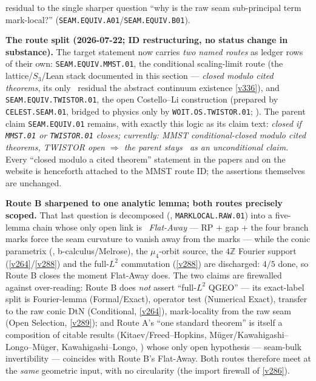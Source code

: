 \documentclass[11pt,a4paper]{article}
\newcommand{\Z}{\mathbb Z}
\begin{document}
\begin{keybox}
residual to the single sharper question ``why is the raw seam sub-principal term mark-local?''
(\texttt{SEAM.EQUIV.A01}/\texttt{SEAM.EQUIV.B01}).
\par\smallskip\noindent\textbf{The route split (2026-07-22; ID restructuring, no status change in
substance).} The target statement now carries \emph{two named routes} as ledger rows of their own:
\texttt{SEAM.EQUIV.MMST.01}, the conditional scaling-limit route (the lattice/$S_3$/Lean stack
documented in this section --- \emph{closed modulo cited theorems}, its only \mO\ residual the
abstract continuum existence \vref{v336}), and \texttt{SEAM.EQUIV.TWISTOR.01}, the open
Costello--Li construction (prepared by \texttt{CELEST.SEAM.01}, bridged to physics only by
\texttt{WOIT.OS.TWISTOR.01}; \mO). The parent claim \texttt{SEAM.EQUIV.01} remains, with exactly this
logic as its claim text: \emph{closed if \texttt{MMST.01} or \texttt{TWISTOR.01} closes; currently:
MMST conditional-closed modulo cited theorems, TWISTOR open $\Rightarrow$ the parent stays \mO\ as an
unconditional claim.} Every ``closed modulo a cited theorem'' statement in the papers and on the
website is henceforth attached to the MMST route ID; the assertions themselves are unchanged.
\par\smallskip\noindent\textbf{Route B sharpened to one analytic lemma; both routes precisely scoped.}
That last question is decomposed (, \texttt{MARKLOCAL.RAW.01}) into a five-lemma
chain whose only open link is \mO\ \emph{Flat-Away} --- RP $+$ gap $+$ the four branch marks force the seam
curvature to vanish away from the marks --- while the conic parametrix (\mC, b-calculus/Melrose), the
$\mu_4$-orbit source, the $4\Z$ Fourier support (\vref{v264}/\vref{v288}) and the full-$L^2$ commutation
(\vref{v288}) are discharged: $4/5$ done, so Route B closes the moment Flat-Away does. The two claims are
firewalled against over-reading: Route B does \emph{not} assert ``full-$L^2$ QGEO'' --- its exact-label split is
Fourier-lemma (Formal/Exact), operator test (Numerical Exact), transfer to the raw conic DtN (Conditional,
\vref{v264}), mark-locality from the raw seam (Open Selection, \vref{v289}); and Route A's ``one standard
theorem'' is itself a composition of citable results (Kitaev/Freed--Hopkins, M\"uger/Kawahigashi--Longo--M\"uger,
Kawahigashi--Longo, ) whose only open hypothesis ---
seam-bulk invertibility --- coincides with Route B's Flat-Away. Both routes therefore meet at the \emph{same}
geometric input, with no circularity (the import firewall of \vref{v286}).

\end{keybox}
\end{document}
